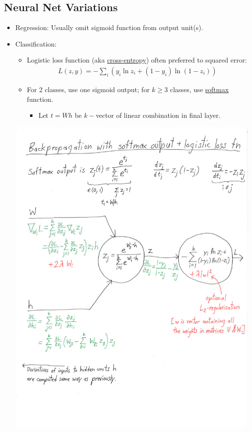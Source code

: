 \documentclass[10pt]{article}
\begin{document}
\subsection*{Neural Net Variations}
\begin{itemize}
	\item Regression: Usually omit sigmoid function from output unit(s).
	\item Classification:
		\begin{itemize}
			\item Logistic loss function (aka \underline{cross-entropy}) often preferred to squared error:
			\begin{align*}
				L(z,y) = -\sum_{i} (y_{i}\ln z_{i} + (1-y_{i}) \ln (1-z_{i}))
			\end{align*}
			\item For 2 classes, use one sigmoid output; for $k \geq 3$ classes, use \underline{softmax} function.
				\begin{itemize}
					\item Let $t = Wh$ be $k-$vector of linear combination in final layer.
				\end{itemize}
		\end{itemize}
		\includegraphics[scale=0.7]{softmaxprop}
	

\end{itemize}
\end{document}
